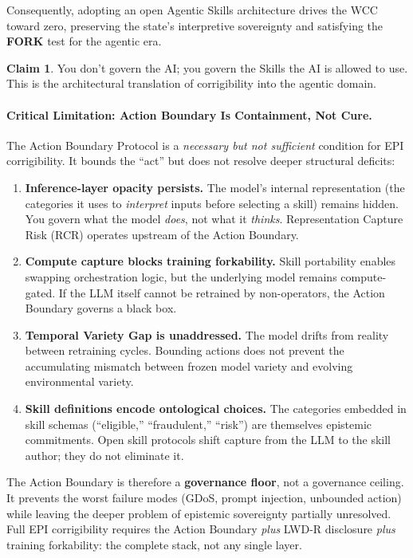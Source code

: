 \documentclass[11pt,a4paper]{article}
\theoremstyle{definition}
\newtheorem{claim}{Claim}[section]
\begin{document}
Consequently, adopting an open Agentic Skills architecture drives the WCC toward zero, preserving the state's interpretive sovereignty and satisfying the \textbf{FORK} test for the agentic era.

\begin{claim}
You don't govern the AI; you govern the Skills the AI is allowed to use. This is the architectural translation of corrigibility into the agentic domain.
\end{claim}

\paragraph{Critical Limitation: Action Boundary Is Containment, Not Cure.} The Action Boundary Protocol is a \textit{necessary but not sufficient} condition for EPI corrigibility. It bounds the ``act'' but does not resolve deeper structural deficits:

\begin{enumerate}[noitemsep]
    \item \textbf{Inference-layer opacity persists.} The model's internal representation (the categories it uses to \textit{interpret} inputs before selecting a skill) remains hidden. You govern what the model \textit{does}, not what it \textit{thinks}. Representation Capture Risk (RCR) operates upstream of the Action Boundary.

    \item \textbf{Compute capture blocks training forkability.} Skill portability enables swapping orchestration logic, but the underlying model remains compute-gated. If the LLM itself cannot be retrained by non-operators, the Action Boundary governs a black box.

    \item \textbf{Temporal Variety Gap is unaddressed.} The model drifts from reality between retraining cycles. Bounding actions does not prevent the accumulating mismatch between frozen model variety and evolving environmental variety.

    \item \textbf{Skill definitions encode ontological choices.} The categories embedded in skill schemas (``eligible,'' ``fraudulent,'' ``risk'') are themselves epistemic commitments. Open skill protocols shift capture from the LLM to the skill author; they do not eliminate it.
\end{enumerate}

The Action Boundary is therefore a \textbf{governance floor}, not a governance ceiling. It prevents the worst failure modes (GDoS, prompt injection, unbounded action) while leaving the deeper problem of epistemic sovereignty partially unresolved. Full EPI corrigibility requires the Action Boundary \textit{plus} LWD-R disclosure \textit{plus} training forkability: the complete stack, not any single layer.
\end{document}
